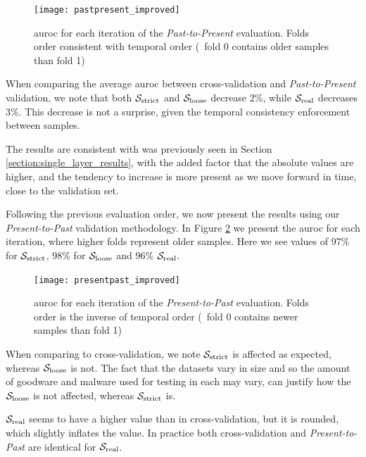 \begin{figure}[!htb]
	\centering
	\texttt{[image: pastpresent\_improved]}
	\caption[Multi layer results for dynamic features in \textit{Past-to-Present}.]{\gls{auroc} for each iteration of the \textit{Past-to-Present} evaluation. Folds order consistent with temporal order (\ie\ fold 0 contains older samples than
		fold 1)}
	\label{fig:pastpresent_modified}
\end{figure}

When comparing the average \gls{auroc} between cross-validation and \textit{Past-to-Present} validation, we note that both $\mathcal{S}_{\mathrm{strict}}$ and $\mathcal{S}_{\mathrm{loose}}$ decrease 2\%, while $\mathcal{S}_{\mathrm{real}}$ decreases 3\%.
This decrease is not a surprise, given the temporal consistency enforcement between samples.

The results are consistent with was previously seen in Section \ref{section:single_layer_results}, with the added factor that the absolute values are higher, and the tendency to increase is more present as we move forward in time, close to the validation set.

\medskip

Following the previous evaluation order, we now present the results using our \textit{Present-to-Past} validation methodology.
In Figure \ref{fig:presentpast_improved} we present the \gls{auroc} for each iteration, where higher folds represent older samples. Here we see values of 97\% for $\mathcal{S}_{\mathrm{strict}}$, 98\% for $\mathcal{S}_{\mathrm{loose}}$ and 96\% $\mathcal{S}_{\mathrm{real}}$.

\begin{figure}[!h]
	\centering
	\texttt{[image: presentpast\_improved]}
	\caption[Multi layer results for dynamic features in \textit{Present-to-Past}.]{\gls{auroc} for each iteration of the \textit{Present-to-Past} evaluation. Folds order is the inverse of temporal order (\ie\ fold 0 contains newer samples than fold 1)}
	\label{fig:presentpast_improved}
\end{figure}

When comparing to cross-validation, we note $\mathcal{S}_{\mathrm{strict}}$ is affected as expected, whereas $\mathcal{S}_{\mathrm{loose}}$ is not.
The fact that the datasets vary in size and so the amount of goodware and malware used for testing in each may vary, can justify how the $\mathcal{S}_{\mathrm{loose}}$ is not affected, whereas $\mathcal{S}_{\mathrm{strict}}$ is.

$\mathcal{S}_{\mathrm{real}}$ seems to have a higher value than in cross-validation, but it is rounded, which slightly inflates the value.
In practice both cross-validation and \textit{Present-to-Past} are identical for $\mathcal{S}_{\mathrm{real}}$.

